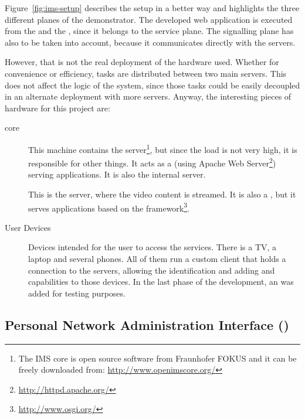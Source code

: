Figure~\ref{fig:ims-setup} describes the setup in a better way and highlights the three different planes of the demonstrator. The developed web application is executed from the  and the , since it belongs to the service plane. The signalling plane has also to be taken into account, because it communicates directly with the servers.

However, that is not the real deployment of the hardware used. Whether for convenience or efficiency, tasks are distributed between two main servers.
This does not affect the logic of the system, since those tasks could be easily decoupled in an alternate deployment with more servers.
Anyway, the interesting pieces of hardware for this project are:

\begin{description}
  \item[ core] This machine contains the  server\footnote{The IMS core is open source software from Fraunhofer FOKUS and it can be freely downloaded from: \url{http://www.openimscore.org/}}, but since the  load is not very high, it is responsible for other things.
  It acts as a  (using Apache Web Server\footnote{\url{http://httpd.apache.org/}}) serving  applications.
  It is also the internal  server.
  \item[] This is the  server, where the video content is streamed.
  It is also a , but it serves  applications based on the  framework\footnote{\url{http://www.osgi.org/}}.
  \item[User Devices] Devices intended for the user to access the services. There is a TV, a laptop and several phones.
  All of them run a custom  client that holds a connection to the servers, allowing the identification and adding  and  capabilities to those devices.
  In the last phase of the development, an  was added for testing purposes.
\end{description}


\subsection{Personal Network Administration Interface ()} %
\label{sub:pnai}



